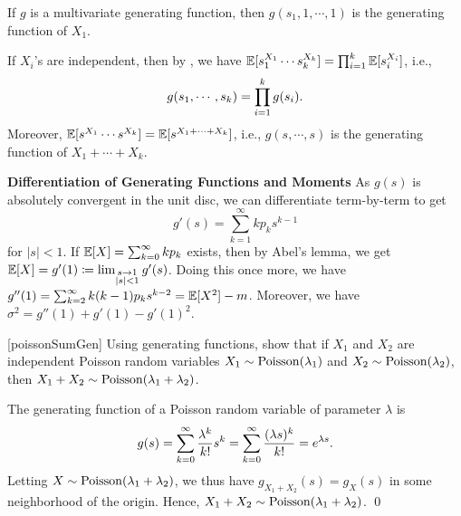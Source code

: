 \documentclass[../probability.tex]{subfiles}
\begin{document}
\begin{note}
    \begin{itemize}
        \ii
        If \(g\) is a multivariate generating function, then
        \(g(s_1, 1, \cdots, 1)\) is the generating function of \(X_1\).

        \ii
        If \(X_i\)'s are independent, then by ,
        we have \(\mathbb{E}[s_1^{X_1}\cdots s_k^{X_k}] = \prod_{i=1}^k \mathbb{E}[s_i^{X_i}]\),
        i.e.,
        \[
            g(s_1, \cdots, s_k) = \prod_{i=1}^k g(s_i)\text.
        \]
        Moreover, \(\mathbb{E}[s^{X_1} \cdots s^{X_k}] = \mathbb{E}[s^{X_1+\cdots+X_k}]\), i.e.,
        \(g(s, \cdots, s)\) is the generating function of \(X_1 + \cdots + X_k\).
    \end{itemize}
\end{note}

\begin{note}%
    \textbf{Differentiation of Generating Functions and Moments}\hspace*{.5cm}
    As \(g(s)\) is absolutely convergent in the unit disc, we can differentiate term-by-term to get
    \[
        g'(s) = \sum_{k=1}^\infty kp_ks^{k-1}
    \]
    for \(|s| < 1\). If \(\mathbb{E}[X] = \sum_{k=0}^\infty kp_k\) exists, then by Abel's lemma, we get
    \(\mathbb{E}[X] = g'(1) \coloneqq \lim_{\substack{s \to 1\\|s| < 1}} g'(s)\). Doing this once more,
    we have \(g''(1) = \sum_{k=2}^\infty k(k-1)p_k s^{k-2} = \mathbb{E}[X^2] - m\). Moreover, we have
    \(\sigma^2 = g''(1) + g'(1) - g'(1)^2\).
\end{note}

\begin{Exercise}{}[poissonSumGen]
    Using generating functions, show that if \(X_1\) and \(X_2\) are independent
    Poisson random variables \(X_1 \sim \operatorname{Poisson}(\lambda_1)\) and \(X_2 \sim \operatorname{Poisson}(\lambda_2)\),
    then \(X_1 + X_2 \sim \operatorname{Poisson}(\lambda_1+\lambda_2)\).
\end{Exercise}
\begin{solution}
    The generating function of a Poisson random variable of parameter \(\lambda\) is
    \[
        g(s) = \sum_{k=0}^\infty \frac{\lambda^k}{k!} s^k
        = \sum_{k=0}^\infty \frac{(\lambda s)^k}{k!} = e^{\lambda s}\text.
    \]
    Letting \(X \sim \operatorname{Poisson}(\lambda_1 + \lambda_2)\),
    we thus have \(g_{X_1+X_2}(s) = g_{X}(s)\) in some neighborhood of the origin.
    Hence, \(X_1 + X_2 \sim \operatorname{Poisson}(\lambda_1+\lambda_2)\).
    \qed
\end{solution}
\end{document}
